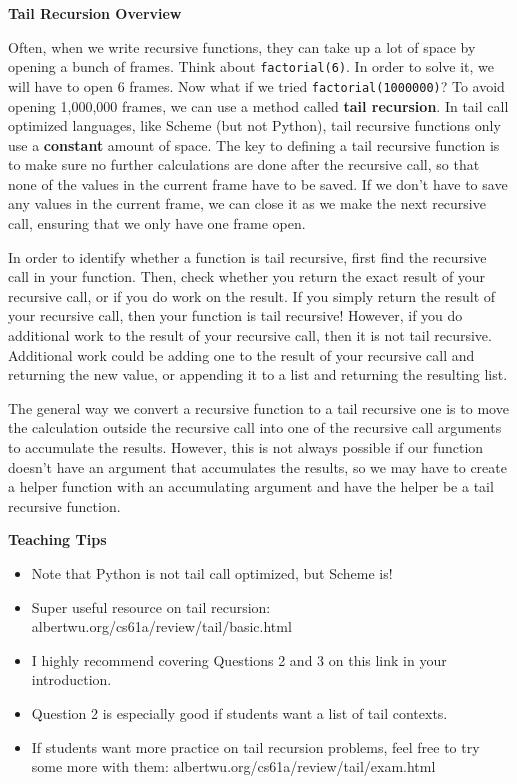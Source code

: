 \textbf{Tail Recursion Overview }

Often, when we write recursive functions, they can take up a lot of space by opening a bunch of frames. Think about \texttt{factorial(6)}. In order to solve it, we will have to open 6 frames. Now what if we tried \texttt{factorial(1000000)}? To avoid opening 1,000,000 frames, we can use a method called \textbf{tail recursion}. In tail call optimized languages, like Scheme (but not Python), tail recursive functions only use a \textbf{constant} amount of space. The key to defining a tail recursive function is to make sure no further calculations are done after the recursive call, so that none of the values in the current frame have to be saved. If we don’t have to save any values in the current frame, we can close it as we make the next recursive call, ensuring that we only have one frame open. 

In order to identify whether a function is tail recursive, first find the recursive call in your function. Then, check whether you return the exact result of your recursive call, or if you do work on the result. If you simply return the result of your recursive call, then your function is tail recursive! However, if you do additional work to the result of your recursive call, then it is not tail recursive. Additional work could be adding one to the result of your recursive call and returning the new value, or appending it to a list and returning the resulting list.

The general way we convert a recursive function to a tail recursive one is to move the calculation outside the recursive call into one of the recursive call arguments to accumulate the results. However, this is not always possible if our function doesn’t have an argument that accumulates the results, so we may have to create a helper function with an accumulating argument and have the helper be a tail recursive function.

\begin{guide}
\begin{blocksection}
\textbf{Teaching Tips}
  \begin{itemize}
    \item Note that Python is not tail call optimized, but Scheme is!
    \item Super useful resource on tail recursion: albertwu.org/cs61a/review/tail/basic.html
    \item I highly recommend covering Questions 2 and 3 on this link in your introduction.
    \item Question 2 is especially good if students want a list of tail contexts.
    \item If students want more practice on tail recursion problems, feel free to try some more with them: albertwu.org/cs61a/review/tail/exam.html
  \end{itemize}
\end{blocksection}
\end{guide}

